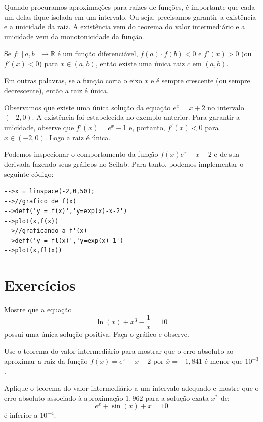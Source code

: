 \documentclass[main.tex]{subfiles}
\begin{document}
Quando procuramos aproximações para raízes de funções, é importante que cada um delas fique isolada em um intervalo. Ou seja, precisamos garantir a existência e a unicidade da raiz. A existência vem do teorema do valor intermediário e a unicidade vem da monotonicidade da função.
\begin{teo}
Se $f:[a,b]\to\mathbb{R}$ é um função diferenciável, $f(a)\cdot f(b)<0$ e $f'(x)>0$ (ou $f'(x)<0$) para $x\in(a,b)$, então existe uma única raiz $c$ em $(a,b)$.
\end{teo}

Em outras palavras, se a função corta o eixo $x$ e é sempre crescente (ou sempre decrescente), então a raiz é única.
\begin{ex}
Observamos que existe uma única solução da equação $e^x=x+2$ no intervalo $(-2,0)$. A existência foi estabelecida no exemplo anterior. Para garantir a unicidade, observe que $f'(x)=e^x-1$ e, portanto, $f'(x)<0$ para $x\in(-2,0)$. Logo a raiz é única.

\ifisscilab
Podemos inspecionar o comportamento da função $f(x) e^x - x - 2$ e de sua derivada fazendo seus gráficos no Scilab. Para tanto, podemos implementar o seguinte código:
\begin{verbatim}
-->x = linspace(-2,0,50);
-->//grafico de f(x)
-->deff('y = f(x)','y=exp(x)-x-2')
-->plot(x,f(x))
-->//graficando a f'(x)
-->deff('y = fl(x)','y=exp(x)-1')
-->plot(x,fl(x))
\end{verbatim}
\fi
\end{ex}

\section*{Exercícios}

\begin{Exercise}Mostre que a equação
  \begin{equation*}
    \ln(x)+x^3-\frac{1}{x}=10  
  \end{equation*}
possui uma única solução positiva. Faça o gráfico e observe.
\end{Exercise}

\begin{Exercise} Use o teorema do valor intermediário para mostrar que o erro absoluto ao aproximar a raiz da função $f(x)=e^x-x-2$ por $\overline{x}=-1,841$ é menor que $10^{-3}$.
\end{Exercise}

\begin{Exercise} Aplique o teorema do valor intermediário a um intervalo adequado e mostre que o erro absoluto associado à aproximação $1,962$ para a solução  exata $x^*$ de:
  \begin{equation*}
    e^x+\sin (x) +x = 10  
  \end{equation*}
é inferior a $10^{-4}$.
\end{Exercise}
\end{document}
